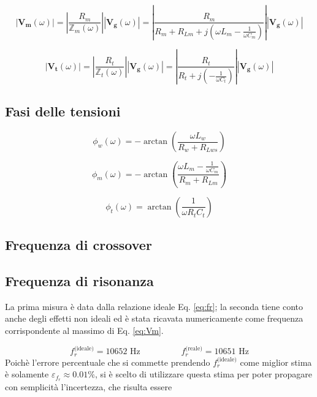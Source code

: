 \documentclass[12pt,italian]{article}
\begin{document}
\begin{equation}
	\left| \mathbf{V_{m}}(\omega) \right| = \left| \frac{R_{m}}
	{\mathbb{Z}_{m}(\omega)}\right|\left| \mathbf{V_{g}}(\omega) \right| = \left| \frac{R_{m}}{R_{m}+R_{Lm} + j (\omega L_m - \frac{1}{\omega C_{m}})} \right| \left| \mathbf{V_{g}}(\omega) \right|
\end{equation}

\begin{equation}
	\left| \mathbf{V_{t}}(\omega) \right| = \left| \frac{R_{t}}
	{\mathbb{Z}_{t}(\omega)}\right|\left| \mathbf{V_{g}}(\omega) \right| = \left| \frac{R_{t}}{R_{t} + j (-\frac{1}{\omega C_{t}})}\right|\left| \mathbf{V_{g}}(\omega) \right|
\end{equation}

\subsection{Fasi delle tensioni}
\label{sec:fasi}

\begin{equation}
	\phi_{w}(\omega) = - \arctan\left(\frac{\omega L_{w}}{R_{w}+R_{Lws}}\right)
\end{equation}

\begin{equation}
	\phi_{m}(\omega) = - \arctan\left(\frac{\omega L_{m} - \frac{1}{\omega C_{m}}}{R_{m}+R_{Lm}}\right)
\end{equation}

\begin{equation}
	\phi_{t}(\omega) = \arctan\left(\frac{1}{\omega R_{t} C_{t}}\right)
\end{equation}

\subsection{Frequenza di crossover}
\label{sec:crossFreq}

\subsection{Frequenza di risonanza}\label{sec:resFreq}
La prima misura è data dalla relazione ideale Eq. \eqref{eq:fr}; la seconda
tiene conto anche degli effetti non ideali ed è stata ricavata numericamente
come frequenza corrispondente al massimo di Eq. \eqref{eq:Vm}.

\begin{equation*}
	f_{r}^{\text{(ideale)}} = 10652 \text{ Hz} \hspace{2cm} f_{r}^{\text{(reale)}} = 10651 \text{ Hz}
\end{equation*}
Poichè l'errore percentuale che si commette prendendo $f_{r}^{\text{(ideale)}}$
come miglior stima è solamente $\varepsilon_{f_r} \approx 0.01\%$, si è scelto
di utilizzare questa stima per poter propagare con semplicità l'incertezza, che
risulta essere
\end{document}
